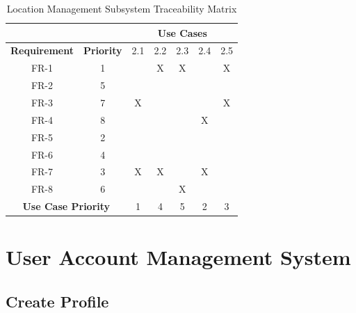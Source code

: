 \documentclass{article}
\begin{document}
\begin{enumerate}
\begin{table}[]
\centering
\caption{Location Management Subsystem Traceability Matrix}
\label{my-label}
\begin{tabular}{cc|c|c|c|c|c|}
\cline{3-7}
                                           &                   & \multicolumn{5}{c|}{\textbf{Use Cases}} \\ \hline
\multicolumn{1}{|c|}{\textbf{Requirement}} & \textbf{Priority} & 2.1    & 2.2    & 2.3   & 2.4   & 2.5   \\ \hline
\multicolumn{1}{|c|}{FR-1}                 & 1                 &        & X      & X     &       & X     \\ \hline
\multicolumn{1}{|c|}{FR-2}                 & 5                 &        &        &       &       &       \\ \hline
\multicolumn{1}{|c|}{FR-3}                 & 7                 & X      &        &       &       & X     \\ \hline
\multicolumn{1}{|c|}{FR-4}                 & 8                 &        &        &       & X     &       \\ \hline
\multicolumn{1}{|c|}{FR-5}                 & 2                 &        &        &       &       &       \\ \hline
\multicolumn{1}{|c|}{FR-6}                 & 4                 &        &        &       &       &       \\ \hline
\multicolumn{1}{|c|}{FR-7}                 & 3                 & X      & X      &       & X     &       \\ \hline
\multicolumn{1}{|c|}{FR-8}                 & 6                 &        &        & X     &       &       \\ \hline
\multicolumn{2}{|c|}{\textbf{Use Case Priority}}               & 1      & 4      & 5     & 2     & 3     \\ \hline
\end{tabular}
\end{table}

\section{User Account Management System}

	\subsection{Create Profile}

	\centering


\end{enumerate}
\end{document}
